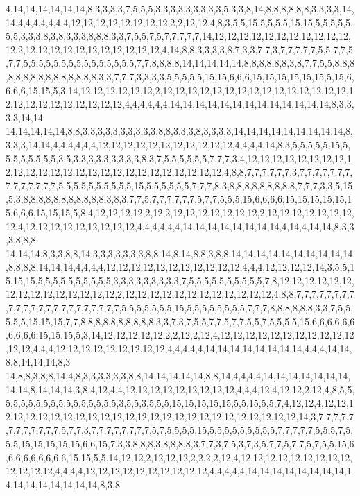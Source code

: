 4,14,14,14,14,14,14,8,3,3,3,3,7,5,5,5,3,3,3,3,3,3,3,3,3,5,3,3,8,14,8,8,8,8,8,8,3,3,3,3,14,14,4,4,4,4,4,4,4,12,12,12,12,12,12,12,12,2,2,12,12,4,8,3,5,5,15,5,5,5,5,15,15,5,5,5,5,5,5,5,3,3,3,8,3,8,3,3,3,8,8,8,3,3,7,5,5,7,5,7,7,7,7,7,14,12,12,12,12,12,12,12,12,12,12,12,12,2,12,12,12,12,12,12,12,12,12,12,12,4,14,8,8,3,3,3,3,8,7,3,3,7,7,3,7,7,7,7,7,5,5,7,7,5,7,7,5,5,5,5,5,5,5,5,5,5,5,5,5,5,5,7,7,8,8,8,8,14,14,14,14,14,8,8,8,8,8,8,3,8,7,7,5,5,8,8,8,8,8,8,8,8,8,8,8,8,8,8,8,3,3,7,7,7,3,3,3,3,5,5,5,5,5,15,15,6,6,6,15,15,15,15,15,15,5,15,6,6,6,6,15,15,5,3,14,12,12,12,12,12,12,2,12,12,12,12,12,12,12,12,12,12,12,12,12,12,12,12,12,12,12,12,12,12,12,12,12,4,4,4,4,4,4,14,14,14,14,14,14,14,14,14,14,14,14,14,8,3,3,3,3,14,14
14,14,14,14,14,8,8,3,3,3,3,3,3,3,3,3,3,8,8,3,3,3,8,3,3,3,3,14,14,14,14,14,14,14,14,14,8,3,3,3,14,14,4,4,4,4,4,4,12,12,12,12,12,12,12,12,12,12,12,4,4,4,4,14,8,3,5,5,5,5,5,15,5,5,5,5,5,5,5,5,3,5,3,3,3,3,3,3,3,3,3,8,3,7,5,5,5,5,5,5,7,7,7,3,4,12,12,12,12,12,12,12,12,12,12,12,12,12,12,12,12,12,12,12,12,12,12,12,12,12,12,4,8,8,7,7,7,7,7,7,3,7,7,7,7,7,7,7,7,7,7,7,7,7,7,5,5,5,5,5,5,5,5,5,5,15,5,5,5,5,5,5,7,7,7,8,3,8,8,8,8,8,8,8,8,8,7,7,7,3,3,5,15,5,3,8,8,8,8,8,8,8,8,8,8,8,3,8,3,7,7,5,7,7,7,7,7,7,5,7,7,5,5,5,15,6,6,6,6,15,15,15,15,15,15,6,6,6,15,15,15,5,8,4,12,12,12,12,2,12,2,12,12,12,12,12,12,12,2,12,12,12,12,12,12,12,12,4,12,12,12,12,12,12,12,12,12,4,4,4,4,4,4,14,14,14,14,14,14,14,14,4,14,4,14,14,8,3,3,3,8,8,8
14,14,14,8,3,3,8,8,14,3,3,3,3,3,3,3,8,8,14,8,14,8,8,3,8,8,14,14,14,14,14,14,14,14,14,14,8,8,8,8,14,14,14,4,4,4,4,12,12,12,12,12,12,12,12,12,12,12,4,4,4,12,12,12,12,14,3,5,5,15,15,15,5,5,5,5,5,5,5,5,5,5,3,3,3,3,3,3,3,3,3,7,5,5,5,5,5,5,5,5,5,5,7,8,12,12,12,12,12,12,12,12,12,12,12,12,12,12,12,2,12,12,12,12,12,12,12,12,12,12,12,12,4,8,8,7,7,7,7,7,7,7,7,7,7,7,7,7,7,7,7,7,7,7,7,7,7,7,5,5,5,5,5,5,5,15,5,5,5,5,5,5,5,5,7,7,7,8,8,8,8,8,8,3,3,7,5,5,5,5,5,15,15,15,7,7,8,8,8,8,8,8,8,8,8,8,3,3,7,3,7,5,5,7,7,5,7,7,5,5,7,5,5,5,5,15,6,6,6,6,6,6,6,6,6,6,15,15,15,5,3,14,12,12,12,12,12,2,2,12,2,12,4,12,12,12,12,12,12,12,12,12,12,12,12,12,4,4,4,12,12,12,12,12,12,12,12,12,4,4,4,4,4,14,14,14,14,14,14,14,14,4,4,4,14,14,8,8,14,14,14,8,3
14,8,8,3,8,8,14,4,8,3,3,3,3,3,3,8,8,14,14,14,14,14,8,8,14,4,4,4,4,14,14,14,14,14,14,14,14,14,8,14,14,14,3,8,4,12,4,4,12,12,12,12,12,12,12,12,12,4,4,4,12,4,12,12,2,12,4,8,5,5,5,5,5,5,5,5,5,5,5,5,5,5,5,5,5,3,5,5,3,5,5,5,15,15,15,15,15,5,5,15,5,5,7,4,12,12,4,12,12,12,12,12,12,12,12,12,12,12,12,12,12,12,12,12,12,12,12,12,12,12,12,12,12,14,3,7,7,7,7,7,7,7,7,7,7,7,7,5,7,7,3,7,7,7,7,7,7,7,7,5,7,5,5,5,5,15,5,5,5,5,5,5,5,5,5,7,7,7,7,7,5,5,5,7,5,5,5,15,15,15,15,15,6,6,15,7,3,3,8,8,8,3,8,8,8,8,3,7,7,3,7,5,3,7,3,5,7,7,5,7,7,5,7,5,5,15,6,6,6,6,6,6,6,6,6,15,15,5,5,14,12,12,2,12,12,12,2,2,2,2,12,4,12,12,12,12,12,12,12,12,12,12,12,12,12,4,4,4,4,12,12,12,12,12,12,12,12,12,12,4,4,4,4,4,14,14,14,14,14,14,14,14,14,14,14,14,14,14,14,14,8,3,8

